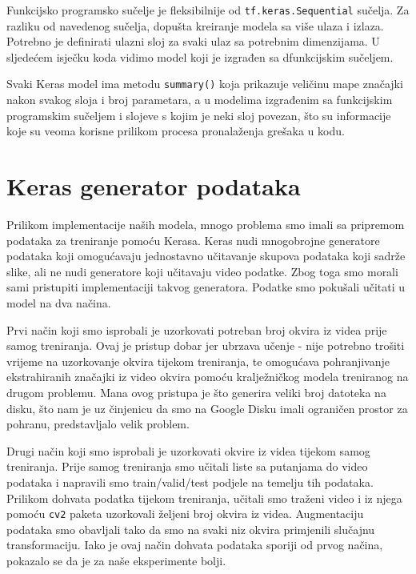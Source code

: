 \documentclass[times, utf8, diplomski,  numeric]{fer}
\begin{document}
Funkcijsko programsko sučelje je fleksibilnije od \verb|tf.keras.Sequential| sučelja. Za razliku od navedenog sučelja, dopušta kreiranje modela sa više ulaza i izlaza. Potrebno je definirati ulazni sloj za svaki ulaz sa potrebnim dimenzijama. U sljedećem isječku koda vidimo model koji je izgrađen sa dfunkcijskim sučeljem.

\par
\par
Svaki Keras model ima metodu \verb|summary()| koja prikazuje veličinu mape značajki nakon svakog sloja i broj parametara, a u modelima izgrađenim sa funkcijskim programskim sučeljem i slojeve s kojim je neki sloj povezan, što su informacije koje su veoma korisne prilikom procesa pronalaženja grešaka u kodu.
\section{Keras generator podataka}
\label{section:data-gen}
Prilikom implementacije naših modela, mnogo problema smo imali sa pripremom podataka za treniranje pomoću Kerasa. Keras nudi mnogobrojne generatore podataka koji omogućavaju jednostavno učitavanje skupova podataka koji sadrže slike, ali ne nudi generatore koji učitavaju video podatke. Zbog toga smo morali sami pristupiti implementaciji takvog generatora. Podatke smo pokušali učitati u model na dva načina. 
\par
Prvi način koji smo isprobali je uzorkovati potreban broj okvira iz videa prije samog treniranja. Ovaj je pristup dobar jer ubrzava učenje - nije potrebno trošiti vrijeme na uzorkovanje okvira tijekom treniranja, te omogućava pohranjivanje ekstrahiranih značajki iz video okvira pomoću kralježničkog modela treniranog na drugom problemu. Mana ovog pristupa je što generira veliki broj datoteka na disku, što nam je uz činjenicu da smo na Google Disku imali ograničen prostor za pohranu, predstavljalo velik problem.
\par
Drugi način koji smo isprobali je uzorkovati okvire iz videa tijekom samog treniranja. Prije samog treniranja smo učitali liste sa putanjama do video podataka i napravili smo train/valid/test podjele na temelju tih podataka. Prilikom dohvata podatka tijekom treniranja, učitali smo traženi video i iz njega pomoću \verb|cv2| paketa uzorkovali željeni broj okvira iz videa. Augmentaciju podataka smo obavljali tako da smo na svaki niz okvira primjenili slučajnu transformaciju. Iako je ovaj način dohvata podataka sporiji od prvog načina, pokazalo se da je za naše eksperimente bolji. 
\newpage
\end{document}
